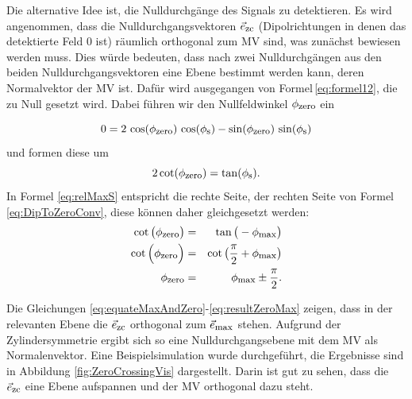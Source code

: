 Die alternative Idee ist, die Nulldurchgänge des Signals zu detektieren. Es wird angenommen, dass die Nulldurchgangsvektoren $\vec{e}_{\textrm{\footnotesize{zc}}}$ (Dipolrichtungen in denen das detektierte Feld 0 ist) räumlich orthogonal zum MV sind, was zunächst bewiesen werden muss. Dies würde bedeuten, dass nach zwei Nulldurchgängen aus den beiden Nulldurchgangsvektoren eine Ebene bestimmt werden kann, deren Normalvektor der MV ist. Dafür wird ausgegangen von Formel\,\ref{eq:formel12}, die zu Null gesetzt wird. Dabei führen wir den Nullfeldwinkel $\phi_{\textrm{\footnotesize{zero}}}$ ein

    \begin{equation}
        0 = 2 \, \cos(\phi_{\textrm{\footnotesize{zero}}})\,\cos(\phi_{\textrm{\footnotesize{s}}}) - \sin(\phi_{\textrm{\footnotesize{zero}}}) \, \sin(\phi_{\textrm{\footnotesize{s}}})
        \label{eq:DipoletoZero}\\
    \end{equation}
und formen diese um
    \begin{equation}
        2 \cot(\phi_{\textrm{\footnotesize{zero}}})=\tan(\phi_{\textrm{\footnotesize{s}}}).
        \label{eq:DipToZeroConv}
    \end{equation}
In Formel \ref{eq:relMaxS} entspricht die rechte Seite, der rechten Seite von Formel \ref{eq:DipToZeroConv}, diese können daher gleichgesetzt werden: 
    \begin{eqnarray}
        \cot\big(\phi_{\textrm{\footnotesize{zero}}}\big) &=& \tan\big(-\phi_{\textrm{\footnotesize{max}}}\big)
        \label{eq:equateMaxAndZero}\\
        \cot\Big(\phi_{\textrm{\footnotesize{zero}}}\Big) &=& \cot\big(\frac{\pi}{2}+\phi_{\textrm{\footnotesize{max}}}\big)
        \label{eq:showAngel}\\
        \phi_{\textrm{\footnotesize{zero}}} &=& \phi_{\textrm{\footnotesize{max}}} \pm \frac{\pi}{2}.
        \label{eq:resultZeroMax}
    \end{eqnarray}
    
    Die Gleichungen \ref{eq:equateMaxAndZero}-\ref{eq:resultZeroMax} zeigen, dass in der relevanten Ebene die $\vec{e}_{\textrm{\footnotesize{zc}}}$ orthogonal zum $\vec{e}_{\textrm{\footnotesize{max}}}$ stehen. Aufgrund der Zylindersymmetrie ergibt sich so eine  Nulldurchgangsebene mit dem MV als Normalenvektor. Eine Beispielsimulation wurde durchgeführt, die Ergebnisse sind in Abbildung \ref{fig:ZeroCrossingVis} dargestellt. Darin ist gut zu sehen, dass die $\vec{e}_{\textrm{\footnotesize{zc}}}$ eine Ebene aufspannen und der MV orthogonal dazu steht. 



